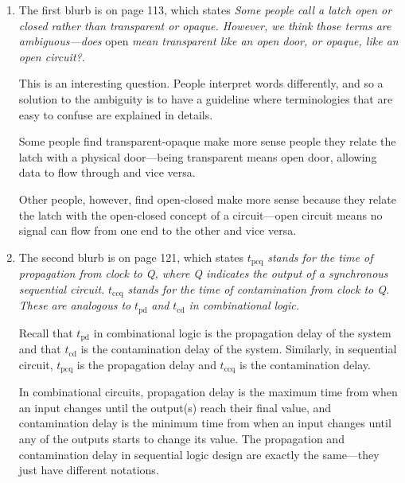 \documentclass[12pt]{article}
\begin{document}
\begin{enumerate}
  \item The first blurb is on page 113, which states \textit{Some people call a latch open or closed rather than transparent or opaque. However, we think those terms are ambiguous---does} open \textit{mean transparent like an open door, or opaque, like an open circuit?}.

  This is an interesting question. People interpret words differently, and so a solution to the ambiguity is to have a guideline where terminologies that are easy to confuse are explained in details.

  Some people find transparent-opaque make more sense people they relate the latch with a physical door---being transparent means open door, allowing data to flow through and vice versa.

  Other people, however, find open-closed make more sense because they relate the latch with the open-closed concept of a circuit---open circuit means no signal can flow from one end to the other and vice versa.

  \item The second blurb is on page 121, which states $t_{\text{pcq}}$ \textit{stands for the time of propagation from clock to Q, where Q indicates the output of a synchronous sequential circuit.} $t_{\text{ccq}}$ \textit{stands for the time of contamination from clock to Q. These are analogous to} $t_{\text{pd}}$ \textit{and} $t_{\text{cd}}$ \textit{in combinational logic.}

  Recall that $t_{\text{pd}}$ in combinational logic is the propagation delay of the system and that $t_{\text{cd}}$ is the contamination delay of the system. Similarly, in sequential circuit, $t_{\text{pcq}}$ is the propagation delay and $t_{\text{ccq}}$ is the contamination delay.

  In combinational circuits, propagation delay is the maximum time from when an input changes until the output(s) reach their final value, and contamination delay is the minimum time from when an input changes until any of the outputs starts to change its value. The propagation and contamination delay in sequential logic design are exactly the same---they just have different notations.
\end{enumerate}
\end{document}
